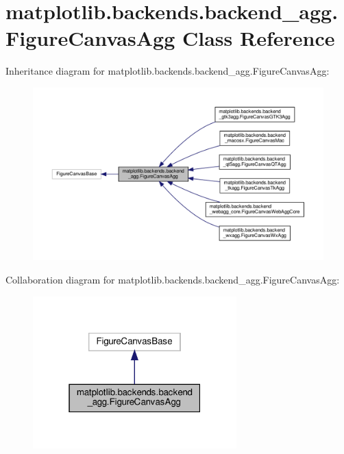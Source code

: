 \hypertarget{classmatplotlib_1_1backends_1_1backend__agg_1_1FigureCanvasAgg}{}\section{matplotlib.\+backends.\+backend\+\_\+agg.\+Figure\+Canvas\+Agg Class Reference}
\label{classmatplotlib_1_1backends_1_1backend__agg_1_1FigureCanvasAgg}


Inheritance diagram for matplotlib.\+backends.\+backend\+\_\+agg.\+Figure\+Canvas\+Agg\+:
\nopagebreak
\begin{figure}[H]
\begin{center}
\leavevmode
\includegraphics[width=350pt]{classmatplotlib_1_1backends_1_1backend__agg_1_1FigureCanvasAgg__inherit__graph}
\end{center}
\end{figure}


Collaboration diagram for matplotlib.\+backends.\+backend\+\_\+agg.\+Figure\+Canvas\+Agg\+:
\nopagebreak
\begin{figure}[H]
\begin{center}
\leavevmode
\includegraphics[width=223pt]{classmatplotlib_1_1backends_1_1backend__agg_1_1FigureCanvasAgg__coll__graph}
\end{center}
\end{figure}
